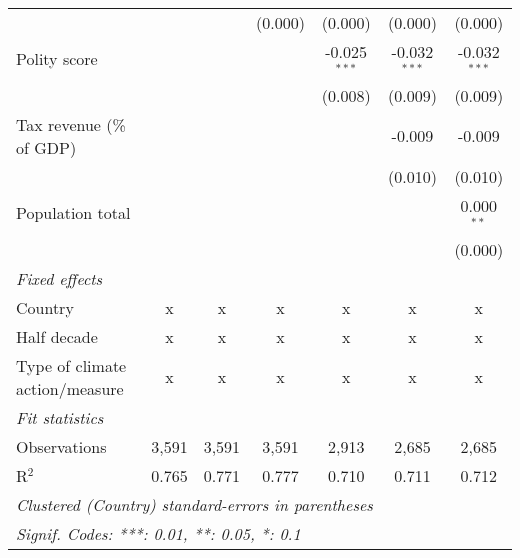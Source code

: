 \begin{tabular}{lcccccc}
                                                                           &                &               & (0.000)       & (0.000)        & (0.000)        & (0.000)\\   
   Polity score                                                            &                &               &               & -0.025$^{***}$ & -0.032$^{***}$ & -0.032$^{***}$\\   
                                                                           &                &               &               & (0.008)        & (0.009)        & (0.009)\\   
   Tax revenue (\% of GDP)                                                 &                &               &               &                & -0.009         & -0.009\\   
                                                                           &                &               &               &                & (0.010)        & (0.010)\\   
   Population total                                                        &                &               &               &                &                & 0.000$^{**}$\\   
                                                                           &                &               &               &                &                & (0.000)\\   
   \emph{Fixed effects}\\
   Country                                                                 & x              & x             & x             & x              & x              & x\\  
   Half decade                                                             & x              & x             & x             & x              & x              & x\\  
   Type of climate action/measure                                          & x              & x             & x             & x              & x              & x\\  
   \midrule \emph{Fit statistics}\\
   Observations                                                            & 3,591          & 3,591         & 3,591         & 2,913          & 2,685          & 2,685\\  
   R$^2$                                                                   & 0.765          & 0.771         & 0.777         & 0.710          & 0.711          & 0.712\\  
   \midrule
   \multicolumn{7}{l}{\emph{Clustered (Country) standard-errors in parentheses}}\\
   \multicolumn{7}{l}{\emph{Signif. Codes: ***: 0.01, **: 0.05, *: 0.1}}\\
\end{tabular}
\par\endgroup


